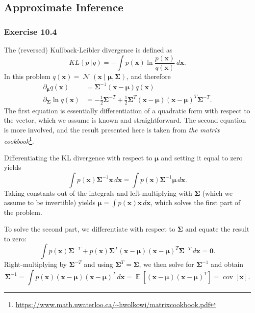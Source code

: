 \documentclass[12pt, a4paper]{article}
\newcommand{\vect}[1]{\bm{#1}}
\DeclareMathOperator{\N}{\mathcal{N}}
\DeclareMathOperator{\E}{\mathbb{E}}
\DeclareMathOperator{\cov}{\operatorname{cov}}
\begin{document}
\subsection{Approximate Inference}

\subsubsection*{Exercise 10.4}
The (reversed) Kullback-Leibler divergence is defined as
\begin{equation*}
	KL(p || q) = - \int p(\vect{x}) 
	\ln  \frac{p(\vect{x})}{q(\vect{x})}
	\, d \vect{x}.
\end{equation*}
In this problem $q(\vect{x}) = \N (\vect{x} \mid \vect{\mu}, \vect{\Sigma})$, and therefore
\begin{align*}
	\partial_{\vect{\mu}} q(\vect{x}) & = \vect{\Sigma}^{-1} 
	\left( \vect{x} - \vect{\mu} \right) q(\vect{x}) \\
	\partial_{\vect{\Sigma}} \ln q(\vect{x}) &=
	- \frac{1}{2} \vect{\Sigma}^{-T}
	+  \frac{1}{2} \vect{\Sigma}^{T}
	\left( \vect{x} - \vect{\mu} \right)
	\left( \vect{x} - \vect{\mu} \right)^{T}
	\vect{\Sigma}^{-T}.
\end{align*}
The first equation is essentially differentiation of a quadratic form with respect to the vector, which we assume is known and straightforward.
The second equation is more involved, and the result presented here is taken from \emph{the matrix cookbook}\footnote{\url{https://www.math.uwaterloo.ca/~hwolkowi/matrixcookbook.pdf}}.

Differentiating the KL divergence with respect to $\vect{\mu}$ and setting it equal to zero yields
\begin{equation*}
\int p(\vect{x}) \vect{\Sigma}^{-1} \vect{x} \, d \vect{x}
=
\int p(\vect{x}) \vect{\Sigma}^{-1} \vect{\mu} \, d \vect{x}.
\end{equation*}
Taking constants out of the integrals and left-multiplying with $\vect{\Sigma}$ (which we assume to be invertible) yields $\vect{\mu} = \int p(\vect{x}) \vect{x} \, d \vect{x}$, which solves the first part of the problem.

To solve the second part, we differentiate with respect to  $\vect{\Sigma}$ and equate the result to zero:
\begin{equation*}
	\int p(\vect{x}) 
	\vect{\Sigma}^{-T}
	+  p(\vect{x})  \vect{\Sigma}^{T}
	\left( \vect{x} - \vect{\mu} \right)
	\left( \vect{x} - \vect{\mu} \right)^{T}
	\vect{\Sigma}^{-T}
	\, d \vect{x} = \vect{0}.
\end{equation*}
Right-multiplying by $\vect{\Sigma}^{-T}$ and using $\vect{\Sigma}^{T} = \vect{\Sigma}$, we then solve for $\vect{\Sigma}^{-1}$ and obtain
\begin{equation*}
	\vect{\Sigma}^{-1} = \int 
	p(\vect{x})  
	\left( \vect{x} - \vect{\mu} \right)
	\left( \vect{x} - \vect{\mu} \right)^{T}
	\, d \vect{x}
	= \E\left[ \left( \vect{x} - \vect{\mu} \right)
	\left( \vect{x} - \vect{\mu} \right)^{T} \right]
	= \cov[\vect{x}].
\end{equation*}
\end{document}
